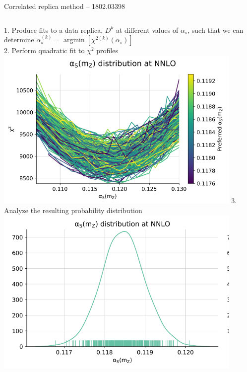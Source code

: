 \documentclass[aspectratio=169, 8pt,t]{beamer}
\begin{document}
\begin{frame}{Correlated replica method -- 1802.03398}
  \begin{columns}
    1. Produce fits to a data replica, $D^k$ at different values of $\alpha_s$, such that we can determine $\alpha_s^{(k)}=\operatorname{argmin}\left[\chi^{2(k)}\left(\alpha_s\right)\right]$ \\\vspace*{1em}
    2. Perform quadratic fit to $\chi^2$ profiles \\
    \includegraphics[width=0.9\textwidth]{figures/parabolaplotnnpdf31.png}
    3. Analyze the resulting probability distribution \\
    \includegraphics[width=0.9\textwidth]{figures/alphasnnpdf31result.png}
  \end{columns}
\end{frame}
\end{document}
